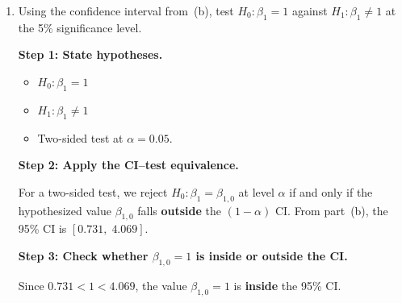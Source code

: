 \documentclass[11pt,a4paper]{article}
\begin{document}
\begin{enumerate}[label=(\alph*)]
\begin{solution}
\textbf{Step 3: Compute the margin of error.}
\[
  \text{Margin of error} = t_{0.025,\, 20} \times \text{SE}(\hat{\beta}_1)
  = 2.086 \times 0.8 = 1.669
\]

\textbf{Step 4: Compute the bounds.}
\begin{align*}
  C = \text{Lower bound} &= \hat{\beta}_1 - \text{Margin of error} = 2.4 - 1.669 = \boxed{0.731} \\
  D = \text{Upper bound} &= \hat{\beta}_1 + \text{Margin of error} = 2.4 + 1.669 = \boxed{4.069}
\end{align*}

\textbf{Step 5: State the interval.}

The 95\% CI for $\beta_1$ is $[0.731,\; 4.069]$.

\textbf{Interpretation:} We are 95\% confident that the true $\beta_1$ lies between $0.731$ and $4.069$. This means that if we repeated the sampling process many times and computed a 95\% CI each time, approximately 95\% of those intervals would contain the true $\beta_1$.

\textbf{Consistency check with part~(a):} The CI does not contain $0$, which is consistent with our rejection of $H_0\colon \beta_1 = 0$ at 5\%.
\end{solution}

\item Using the confidence interval from~(b), test $H_0\colon \beta_1 = 1$ against $H_1\colon \beta_1 \ne 1$ at the 5\% significance level.

\begin{solution}
\textbf{Step 1: State hypotheses.}
\begin{itemize}
  \item $H_0\colon \beta_1 = 1$
  \item $H_1\colon \beta_1 \ne 1$
  \item Two-sided test at $\alpha = 0.05$.
\end{itemize}

\textbf{Step 2: Apply the CI--test equivalence.}

For a two-sided test, we reject $H_0\colon \beta_1 = \beta_{1,0}$ at level $\alpha$ if and only if the hypothesized value $\beta_{1,0}$ falls \textbf{outside} the $(1-\alpha)$ CI. From part~(b), the 95\% CI is $[0.731,\; 4.069]$.

\textbf{Step 3: Check whether $\beta_{1,0} = 1$ is inside or outside the CI.}

Since $0.731 < 1 < 4.069$, the value $\beta_{1,0} = 1$ is \textbf{inside} the 95\% CI.


\end{solution}
\end{enumerate}
\end{document}
